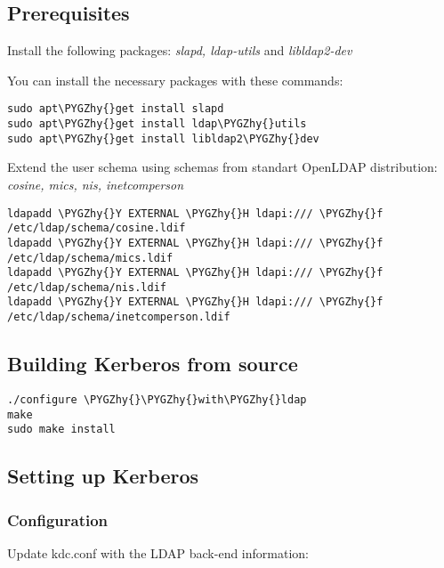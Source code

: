 \documentclass[letterpaper,10pt,english]{sphinxmanual}
\def\PYGZhy{\char`\-}
\begin{document}
\subsection{Prerequisites}
\label{admin/advanced/ldapbackend:prerequisites}
Install the following packages: \emph{slapd, ldap-utils} and \emph{libldap2-dev}

You can install the necessary packages with these commands:

\begin{Verbatim}[commandchars=\\\{\}]
sudo apt\PYGZhy{}get install slapd
sudo apt\PYGZhy{}get install ldap\PYGZhy{}utils
sudo apt\PYGZhy{}get install libldap2\PYGZhy{}dev
\end{Verbatim}

Extend the user schema using schemas from standart OpenLDAP
distribution: \emph{cosine, mics, nis, inetcomperson}

\begin{Verbatim}[commandchars=\\\{\}]
ldapadd \PYGZhy{}Y EXTERNAL \PYGZhy{}H ldapi:/// \PYGZhy{}f /etc/ldap/schema/cosine.ldif
ldapadd \PYGZhy{}Y EXTERNAL \PYGZhy{}H ldapi:/// \PYGZhy{}f /etc/ldap/schema/mics.ldif
ldapadd \PYGZhy{}Y EXTERNAL \PYGZhy{}H ldapi:/// \PYGZhy{}f /etc/ldap/schema/nis.ldif
ldapadd \PYGZhy{}Y EXTERNAL \PYGZhy{}H ldapi:/// \PYGZhy{}f /etc/ldap/schema/inetcomperson.ldif
\end{Verbatim}


\subsection{Building Kerberos from source}
\label{admin/advanced/ldapbackend:building-kerberos-from-source}
\begin{Verbatim}[commandchars=\\\{\}]
./configure \PYGZhy{}\PYGZhy{}with\PYGZhy{}ldap
make
sudo make install
\end{Verbatim}


\subsection{Setting up Kerberos}
\label{admin/advanced/ldapbackend:setting-up-kerberos}

\subsubsection{Configuration}
\label{admin/advanced/ldapbackend:configuration}
Update kdc.conf with the LDAP back-end information:
\end{document}
